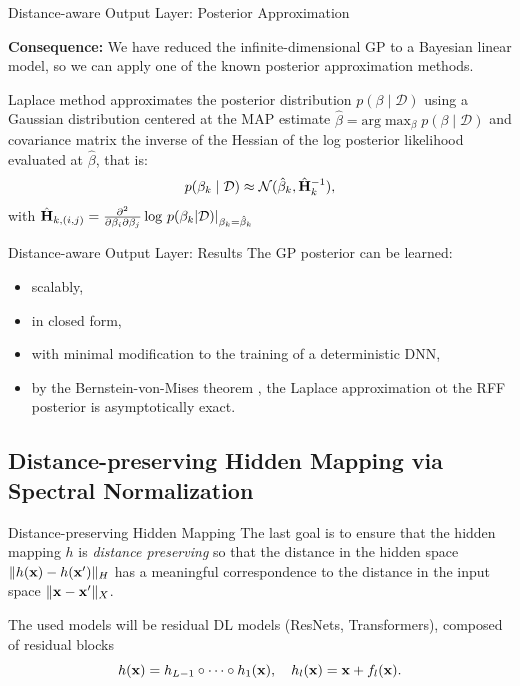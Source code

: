 \documentclass[xcolor=table]{beamer}
\DeclarePairedDelimiter\norm{\lVert}{\rVert}%
\begin{document}
\begin{frame}{Distance-aware Output Layer: Posterior Approximation}
    
\textbf{Consequence:} We have reduced the infinite-dimensional GP to a Bayesian linear model, so we can apply one of the known posterior approximation methods.
\vspace{0.3cm}
\pause
\begin{definition}
    Laplace method approximates the posterior distribution \(p(\beta \mid \mathcal D)\) using a Gaussian distribution centered at the MAP estimate \(\hat \beta = \text{arg}\max_\beta p(\beta \mid \mathcal D)\) and covariance matrix the inverse of the Hessian of the log posterior likelihood evaluated at \(\hat \beta\), that is:
    \[
    p(\beta_k \mid \mathcal D) \approx \mathcal N(\hat \beta_k, \hat {{\mathbf H}}_k^{-1}),
    \]
    with \( \hat{{\mathbf H}}_{k, (i,j)} = \frac{\partial^2}{\partial \beta_i \partial \beta_j} \log \, p(\beta_k|\mathcal D)|_{\beta_k=\hat{\beta}_k}\)
\end{definition}
\end{frame}

\begin{frame}{Distance-aware Output Layer: Results}
The GP posterior can be learned:
    \begin{itemize}
        \item scalably,
        \item in closed form,
        \item with minimal modification to the training of a deterministic DNN,
        \item by the Bernstein-von-Mises theorem \citep{BvMth}, the Laplace approximation ot the RFF posterior is asymptotically exact.
    \end{itemize}
\end{frame}

\subsection{Distance-preserving Hidden Mapping via Spectral Normalization}

\begin{frame}{Distance-preserving Hidden Mapping}
The last goal is to ensure that the hidden mapping \(h\) is \emph{distance preserving} so that the distance in the hidden space \(\norm{h(\bx) - h(\bx')}_H\) has a meaningful correspondence to the distance in the input space \(\norm{\bx - \bx'}_X\).\\
\pause
\begin{nnote}[Assumption]
The used models will be residual DL models (ResNets, Transformers), composed of residual blocks 
\begin{equation}\label{eq:residual:arch}
h({\mathbf x}) = h_{L-1} \circ \cdots \circ h_1({\mathbf x}), \quad h_l({\mathbf x}) = {\mathbf x} + f_l({\mathbf x}).
\end{equation}
\end{nnote}

\end{frame}
\end{document}
